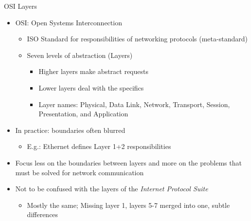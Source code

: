 
\begin{frame}{OSI Layers}
%
\begin{itemize}
\item OSI: Open Systems Interconnection
	\begin{itemize}
	\item ISO Standard for responsibilities of networking protocols (meta-standard)
	\item Seven levels of abstraction (Layers)
		\begin{itemize}
		\item Higher layers make abstract requests
		\item Lower layers deal with the specifics
		\item Layer names: Physical, Data Link, Network, Transport, Session, Presentation, and Application
		\end{itemize}
	\end{itemize}
\pause
\item In practice: boundaries often blurred
	\begin{itemize}
	\item E.\;g.: Ethernet defines Layer 1+2 responsibilities
	\end{itemize}
\item[\Thus] Focus less on the boundaries between layers and more on the problems that must be solved for network communication
\pause
\item Not to be confused with the layers of the \emph{Internet Protocol Suite}
	\begin{itemize}
	\item Mostly the same; Missing layer 1, layers 5-7 merged into one, subtle differences
	\end{itemize}
\end{itemize}
%
\end{frame}


